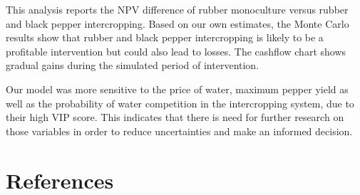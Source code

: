 \documentclass[
]{article}
\begin{document}
This analysis reports the NPV difference of rubber monoculture versus rubber and black pepper intercropping. Based on our own estimates, the Monte Carlo results show that rubber and black pepper intercropping is likely to be a profitable intervention but could also lead to losses. The cashflow chart shows gradual gains during the simulated period of intervention.

Our model was more sensitive to the price of water, maximum pepper yield as well as the probability of water competition in the intercropping system, due to their high VIP score. This indicates that there is need for further research on those variables in order to reduce uncertainties and make an informed decision.

\hypertarget{references}{%
\section*{\texorpdfstring{\textbf{References}}{References}}\label{references}}
\end{document}
